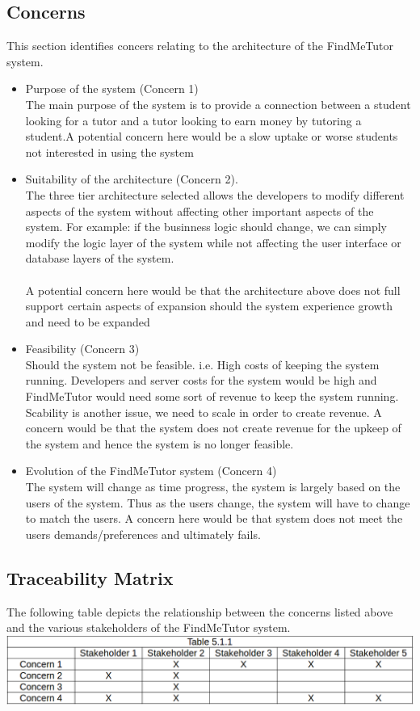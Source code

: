 \documentclass[12pt]{article}
\begin{document}
\subsection{Concerns}
This section identifies concers relating to the architecture of the FindMeTutor system.
\begin{itemize}
\item Purpose of the system (Concern 1)\\
The main purpose of the system is to provide a connection between a student looking for a tutor and a tutor looking to earn money by tutoring a student.A potential concern here would be a slow uptake or worse students not interested in using the system\\
\item Suitability of the architecture (Concern 2).\\  
The three tier architecture selected allows the developers to modify different aspects of the system without affecting other important aspects of the system. For example: if the businness logic should change, we can simply modify the logic layer of the system while not affecting the user interface or database layers of the system.\\\\A potential concern here would be that the architecture above does not full support certain aspects of expansion should the system experience growth and need to be expanded
\item Feasibility (Concern 3)\\
Should the system not be feasible. i.e. High costs of keeping the system running. Developers and server costs for the system would be high and FindMeTutor would need some sort of revenue to keep the system running. Scability is another issue, we need to scale in order to create revenue. A concern would be that the system does not create revenue for the upkeep of the system and hence the system is no longer feasible.
\item Evolution of the FindMeTutor system (Concern 4)\\
The system will change as time progress, the system is largely based on the users of the system. Thus as the users change, the system will have to change to match the users. A concern here would be that system does not meet the users demands/preferences and ultimately fails.
\end{itemize}

\subsection{Traceability Matrix}
The following table depicts the relationship between the concerns listed above and the various stakeholders of the FindMeTutor system.\\
\includegraphics[width=140mm]{./trace.png}
\end{document}

